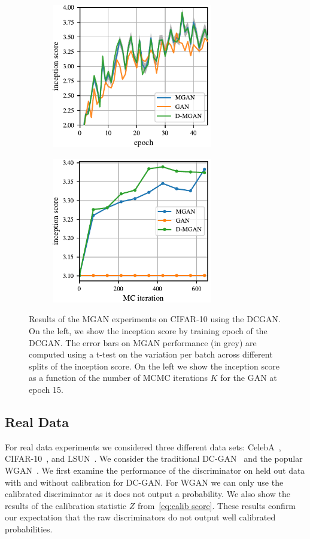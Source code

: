 \documentclass{article}
\begin{document}
\begin{figure}
    \centering
    \begin{subfigure}[b]{0.49\textwidth}
       \includegraphics[width=2.75in]{figures/base_iso.pdf}
    \end{subfigure}
    \begin{subfigure}[b]{0.49\textwidth}
       \includegraphics[width=2.75in]{figures/plot_per_mh.pdf}
    \end{subfigure}
    \caption{{\small
    Results of the MGAN experiments on CIFAR-10 using the DCGAN\@.
    On the left, we show the inception score by training epoch of the DCGAN\@.
    The error bars on MGAN performance (in grey) are computed using a t-test on the variation per batch across different splits of the inception score.
    On the left we show the inception score as a function of the number of MCMC iterations $K$ for the GAN at epoch 15.
    }}
    \label{fig:incep_by_epoch}
\end{figure}

\subsection{Real Data}
For real data experiments we considered three different data sets: CelebA~\citep{Liu2015}, CIFAR-10~\citep{Torralba2008}, and LSUN~\citep{Yu2015}.
We consider the traditional DC-GAN~\citep{Radford2015} and the popular WGAN~\citep{Arjovsky2017}\@.
We first examine the performance of the discriminator on held out data with and without calibration for DC-GAN\@.
For WGAN we can only use the calibrated discriminator as it does not output a probability.
We also show the results of the calibration statistic $Z$ from~\eqref{eq:calib score}.
These results confirm our expectation that the raw discriminators do not output well calibrated probabilities.
\end{document}

